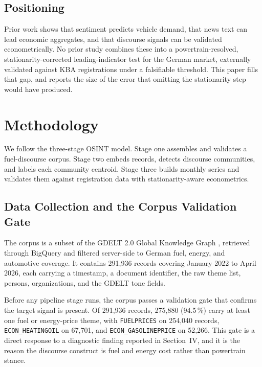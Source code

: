 \documentclass[conference]{IEEEtran}
\begin{document}
\subsection{Positioning}
Prior work shows that sentiment predicts vehicle demand, that news text can lead
economic aggregates, and that discourse signals can be validated
econometrically. No prior study combines these into a powertrain-resolved,
stationarity-corrected leading-indicator test for the German market, externally
validated against KBA registrations under a falsifiable
threshold. This paper fills that gap, and reports the size of the error that
omitting the stationarity step would have produced.

\section{Methodology}
We follow the three-stage OSINT model. Stage one assembles and validates a
fuel-discourse corpus. Stage two embeds records, detects discourse communities,
and labels each community centroid. Stage three builds monthly series and
validates them against registration data with stationarity-aware econometrics.

\subsection{Data Collection and the Corpus Validation Gate}
The corpus is a subset of the GDELT 2.0 Global Knowledge Graph
\cite{gdelt2013}, retrieved through BigQuery and filtered server-side to German
fuel, energy, and automotive coverage. It contains 291{,}936 records covering
January 2022 to April 2026, each carrying a timestamp, a document identifier,
the raw theme list, persons, organizations, and the GDELT tone fields.

Before any pipeline stage runs, the corpus passes a validation gate that
confirms the target signal is present. Of 291{,}936 records, 275{,}880
(94.5\,\%) carry at least one fuel or energy-price theme, with
\texttt{FUELPRICES} on 254{,}040 records, \texttt{ECON\_HEATINGOIL} on
67{,}701, and \texttt{ECON\_GASOLINEPRICE} on 52{,}266. This gate is a direct
response to a diagnostic finding reported in Section~IV, and it is the reason
the discourse construct is fuel and energy cost rather than powertrain stance.
\end{document}
